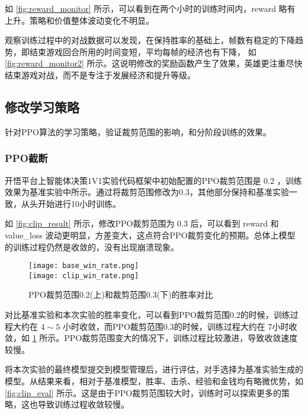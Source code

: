 如 \cref{fig:reward_monitor} 所示，可以看到在两个小时的训练时间内，reward 略有上升。策略和价值整体波动变化不明显。

观察训练过程中的对战数据可以发现，在保持胜率的基础上，帧数有稳定的下降趋势，即结束游戏回合所用的时间变短，平均每帧的经济也有下降， 如 \cref{fig:reward_monitor2} 所示。这说明修改的奖励函数产生了效果，英雄更注重尽快结束游戏对战，而不是专注于发展经济和提升等级。

\subsection{修改学习策略}

针对PPO算法的学习策略，验证裁剪范围的影响，和分阶段训练的效果。

\subsubsection{PPO截断}
开悟平台上智能体决策1V1实验代码框架中初始配置的PPO裁剪范围是 0.2 ，训练效果为基准实验中所示。通过将裁剪范围修改为0.3，其他部分保持和基准实验一致，从头开始进行10小时训练。

如 \cref{fig:clip_result} 所示，修改PPO裁剪范围为 0.3 后，可以看到 reward 和 value\_loss 波动更明显，方差变大，这点符合PPO裁剪变化的预期。总体上模型的训练过程仍然是收敛的，没有出现崩溃现象。

\begin{figure}[htbp]
    \centering
    \texttt{[image: base\_win\_rate.png]} \\
    \texttt{[image: clip\_win\_rate.png]}
    \caption[short]{PPO裁剪范围0.2(上)和裁剪范围0.3(下)的胜率对比}
    \label{fig:win_rate_diff}
\end{figure}

对比基准实验和本次实验的胜率变化，可以看到PPO裁剪范围0.2的时候，训练过程大约在 $4 \sim 5$ 小时收敛，而PPO裁剪范围0.3的时候，训练过程大约在 7小时收敛，如 \cref{fig:win_rate_diff} 所示。PPO裁剪范围变大的情况下，训练过程比较激进，导致收敛速度较慢。

将本次实验的最终模型提交到模型管理后，进行评估，对手选择为基准实验生成的模型。从结果来看，相对于基准模型，胜率、击杀、经验和金钱均有略微优势，如\cref{fig:clip_eval} 所示。这是由于PPO裁剪范围较大时，训练时可以探索更多的策略，这也导致训练过程收敛较慢。

